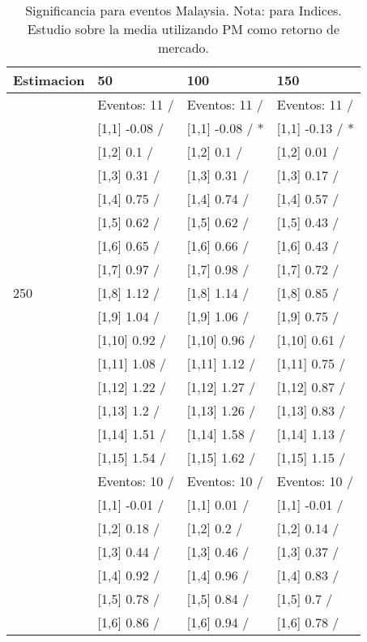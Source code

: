 \begin{table}

\caption{Significancia para eventos Malaysia. Nota: para Indices. Estudio sobre la media utilizando PM como retorno de mercado.}
\centering
\begin{tabular}[t]{llll}
\toprule
Estimacion & 50 & 100 & 150\\
\midrule
 & Eventos:  11 / & Eventos:  11 / & Eventos:  11 /\\
 & {}[1,1] -0.08  / & {}[1,1] -0.08  / * & {}[1,1] -0.13  / *\\
 & {}[1,2] 0.1  / & {}[1,2] 0.1  / & {}[1,2] 0.01  /\\
 & {}[1,3] 0.31  / & {}[1,3] 0.31  / & {}[1,3] 0.17  /\\
 & {}[1,4] 0.75  / & {}[1,4] 0.74  / & {}[1,4] 0.57  /\\
\addlinespace
 & {}[1,5] 0.62  / & {}[1,5] 0.62  / & {}[1,5] 0.43  /\\
 & {}[1,6] 0.65  / & {}[1,6] 0.66  / & {}[1,6] 0.43  /\\
 & {}[1,7] 0.97  / & {}[1,7] 0.98  / & {}[1,7] 0.72  /\\
250 & {}[1,8] 1.12  / & {}[1,8] 1.14  / & {}[1,8] 0.85  /\\
 & {}[1,9] 1.04  / & {}[1,9] 1.06  / & {}[1,9] 0.75  /\\
\addlinespace
 & {}[1,10] 0.92  / & {}[1,10] 0.96  / & {}[1,10] 0.61  /\\
 & {}[1,11] 1.08  / & {}[1,11] 1.12  / & {}[1,11] 0.75  /\\
 & {}[1,12] 1.22  / & {}[1,12] 1.27  / & {}[1,12] 0.87  /\\
 & {}[1,13] 1.2  / & {}[1,13] 1.26  / & {}[1,13] 0.83  /\\
 & {}[1,14] 1.51  / & {}[1,14] 1.58  / & {}[1,14] 1.13  /\\
\addlinespace
 & {}[1,15] 1.54  / & {}[1,15] 1.62  / & {}[1,15] 1.15  /\\
 & Eventos:  10 / & Eventos:  10 / & Eventos:  10 /\\
 & {}[1,1] -0.01  / & {}[1,1] 0.01  / & {}[1,1] -0.01  /\\
 & {}[1,2] 0.18  / & {}[1,2] 0.2  / & {}[1,2] 0.14  /\\
 & {}[1,3] 0.44  / & {}[1,3] 0.46  / & {}[1,3] 0.37  /\\
\addlinespace
 & {}[1,4] 0.92  / & {}[1,4] 0.96  / & {}[1,4] 0.83  /\\
 & {}[1,5] 0.78  / & {}[1,5] 0.84  / & {}[1,5] 0.7  /\\
 & {}[1,6] 0.86  / & {}[1,6] 0.94  / & {}[1,6] 0.78  /\\

\end{tabular}
\end{table}
